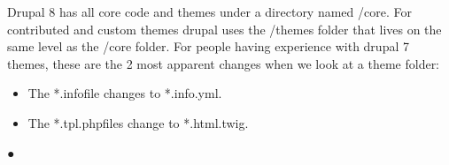 Drupal 8 has all core code and themes under a directory named /core. For contributed and custom themes drupal uses the /themes folder that lives on the same level as the /core folder. For people having experience with drupal 7 themes, these are the 2 most apparent changes when we look at a theme folder:
\begin{itemize}
	\item The *.infofile changes to *.info.yml.
	\item The *.tpl.phpfiles change to *.html.twig.
\end{itemize}
● 
